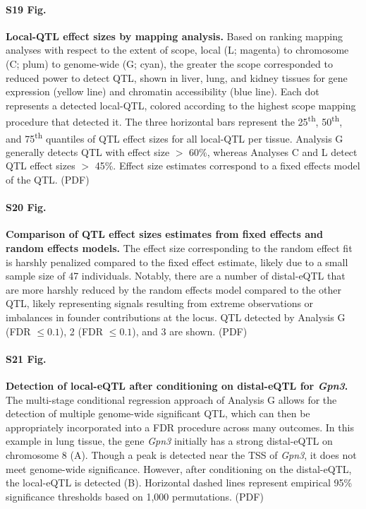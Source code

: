 \documentclass[10pt,letterpaper]{article}
\begin{document}
\paragraph*{S19 Fig.}
\label{S_qtl_effect_sizes_by_method}
{\bf Local-QTL effect sizes by mapping analysis.}
Based on ranking mapping analyses with respect to the extent of scope, local (L; magenta) to chromosome (C; plum) to genome-wide (G; cyan), the greater the scope corresponded to reduced power to detect QTL, shown in liver, lung, and kidney tissues for gene expression (yellow line) and chromatin accessibility (blue line). Each dot represents a detected local-QTL, colored according to the highest scope mapping procedure that detected it. The three horizontal bars represent the 25\textsuperscript{th}, 50\textsuperscript{th}, and 75\textsuperscript{th} quantiles of QTL effect sizes for all local-QTL per tissue. Analysis G generally detects QTL with effect size $>$ 60\%, whereas Analyses C and L detect QTL effect sizes $>$ 45\%. Effect size estimates correspond to a fixed effects model of the QTL. (PDF)

\paragraph*{S20 Fig.}
\label{S_qtl_effect_size_fixefvsranef}
{\bf Comparison of QTL effect sizes estimates from fixed effects and random effects models.}
The effect size corresponding to the random effect fit is harshly penalized compared to the fixed effect estimate, likely due to a small sample size of 47 individuals. Notably, there are a number of distal-eQTL that are more harshly reduced by the random effects model compared to the other QTL, likely representing signals resulting from extreme observations or imbalances in founder contributions at the locus. QTL detected by Analysis G (FDR $\le 0.1$), 2 (FDR $\le 0.1$), and 3 are shown. (PDF)

\paragraph*{S21 Fig.}
\label{S_conditional_scan}
{\bf Detection of local-eQTL after conditioning on distal-eQTL for \textit{Gpn3}.} 
The multi-stage conditional regression approach of Analysis G allows for the detection of multiple genome-wide significant QTL, which can then be appropriately incorporated into a FDR procedure across many outcomes. In this example in lung tissue, the gene \textit{Gpn3} initially has a strong distal-eQTL on chromosome 8 (A). Though a peak is detected near the TSS of \textit{Gpn3}, it does not meet genome-wide significance. However, after conditioning on the distal-eQTL, the local-eQTL is detected (B). Horizontal dashed lines represent empirical 95\% significance thresholds based on 1,000 permutations. (PDF)
\end{document}
